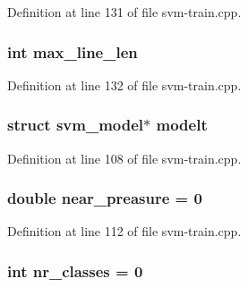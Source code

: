 Definition at line 131 of file svm-\/train.\-cpp.

\hypertarget{_2svm-train_8cpp_acad24c15bee67d2026f56bc94a1188c7}{
\subsubsection[{max\-\_\-line\-\_\-len}]{\setlength{\rightskip}{0pt plus 5cm}int max\-\_\-line\-\_\-len\hspace{0.3cm}{\ttfamily [static]}}}\label{_2svm-train_8cpp_acad24c15bee67d2026f56bc94a1188c7}


Definition at line 132 of file svm-\/train.\-cpp.

\hypertarget{_2svm-train_8cpp_a0b730cfd99e9c8a2ece39a165ebcc5ef}{
\subsubsection[{modelt}]{\setlength{\rightskip}{0pt plus 5cm}struct {\bf svm\-\_\-model}$\ast$ modelt}}\label{_2svm-train_8cpp_a0b730cfd99e9c8a2ece39a165ebcc5ef}


Definition at line 108 of file svm-\/train.\-cpp.

\hypertarget{_2svm-train_8cpp_ab569b65ce2e86831530c897a3ad5c901}{
\subsubsection[{near\-\_\-preasure}]{\setlength{\rightskip}{0pt plus 5cm}double near\-\_\-preasure = 0}}\label{_2svm-train_8cpp_ab569b65ce2e86831530c897a3ad5c901}


Definition at line 112 of file svm-\/train.\-cpp.

\hypertarget{_2svm-train_8cpp_ad88594354ad0cd1b5f3cebf37f8381cf}{
\subsubsection[{nr\-\_\-classes}]{\setlength{\rightskip}{0pt plus 5cm}int nr\-\_\-classes = 0}}\label{_2svm-train_8cpp_ad88594354ad0cd1b5f3cebf37f8381cf}


